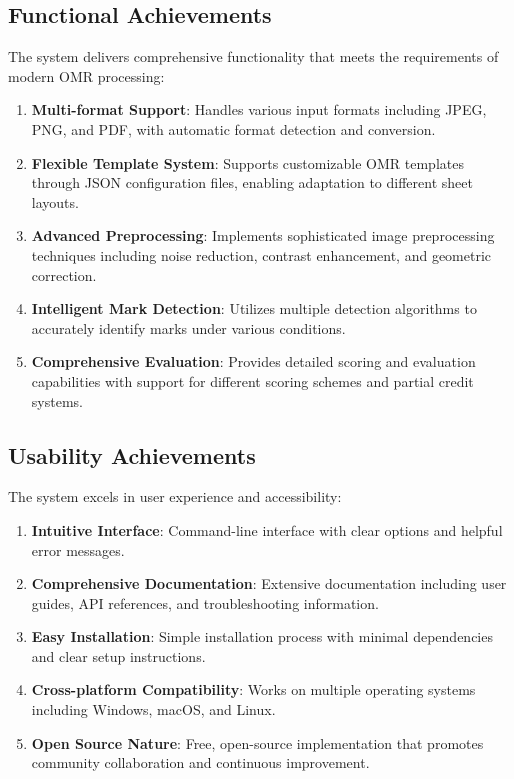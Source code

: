 \subsection{Functional Achievements}

The system delivers comprehensive functionality that meets the requirements of modern OMR processing:

\begin{enumerate}
\item \textbf{Multi-format Support}: Handles various input formats including JPEG, PNG, and PDF, with automatic format detection and conversion.

\item \textbf{Flexible Template System}: Supports customizable OMR templates through JSON configuration files, enabling adaptation to different sheet layouts.

\item \textbf{Advanced Preprocessing}: Implements sophisticated image preprocessing techniques including noise reduction, contrast enhancement, and geometric correction.

\item \textbf{Intelligent Mark Detection}: Utilizes multiple detection algorithms to accurately identify marks under various conditions.

\item \textbf{Comprehensive Evaluation}: Provides detailed scoring and evaluation capabilities with support for different scoring schemes and partial credit systems.
\end{enumerate}

\subsection{Usability Achievements}

The system excels in user experience and accessibility:

\begin{enumerate}
\item \textbf{Intuitive Interface}: Command-line interface with clear options and helpful error messages.

\item \textbf{Comprehensive Documentation}: Extensive documentation including user guides, API references, and troubleshooting information.

\item \textbf{Easy Installation}: Simple installation process with minimal dependencies and clear setup instructions.

\item \textbf{Cross-platform Compatibility}: Works on multiple operating systems including Windows, macOS, and Linux.

\item \textbf{Open Source Nature}: Free, open-source implementation that promotes community collaboration and continuous improvement.
\end{enumerate}

